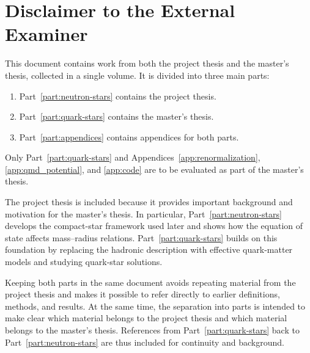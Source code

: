 \chapter*{Disclaimer to the External Examiner}

This document contains work from both the project thesis and the master's
thesis, collected in a single volume. It is divided into three main parts:
\begin{enumerate}
    \item Part~\ref{part:neutron-stars} contains the project thesis.
    \item Part~\ref{part:quark-stars} contains the master's thesis.
    \item Part~\ref{part:appendices} contains appendices for both parts.
\end{enumerate}

Only Part~\ref{part:quark-stars} and Appendices~\ref{app:renormalization},
\ref{app:qmd_potential}, and \ref{app:code} are to be evaluated as part of the
master's thesis.

The project thesis is included because it provides important background and
motivation for the master's thesis. In particular, Part~\ref{part:neutron-stars}
develops the compact-star framework used later and shows how the equation of
state affects mass--radius relations. Part~\ref{part:quark-stars} builds on this
foundation by replacing the hadronic description with effective quark-matter
models and studying quark-star solutions.

Keeping both parts in the same document avoids repeating material from the
project thesis and makes it possible to refer directly to earlier definitions,
methods, and results. At the same time, the separation into parts is intended to
make clear which material belongs to the project thesis and which material
belongs to the master's thesis. References from Part~\ref{part:quark-stars} back
to Part~\ref{part:neutron-stars} are thus included for continuity and background.
